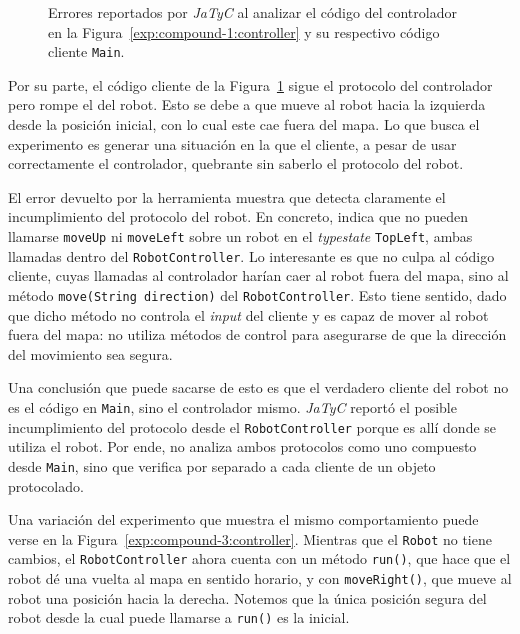 \begin{figure}[htbp]
    \centering
    
    \vspace{0.3cm}
    
    \caption{Errores reportados por \textit{JaTyC} al analizar el código del controlador en la Figura~\ref{exp:compound-1:controller} y su respectivo código cliente \texttt{Main}.}
    \label{exp:compound-1:error}
\end{figure}

Por su parte, el código cliente de la Figura~\ref{exp:compound-1:error} sigue el protocolo del controlador pero rompe el del robot. Esto se debe a que mueve al robot hacia la izquierda desde la posición inicial, con lo cual este cae fuera del mapa. Lo que busca el experimento es generar una situación en la que el cliente, a pesar de usar correctamente el controlador, quebrante sin saberlo el protocolo del robot.

El error devuelto por la herramienta muestra que detecta claramente el incumplimiento del protocolo del robot. En concreto, indica que no pueden llamarse \texttt{moveUp} ni \texttt{moveLeft} sobre un robot en el \textit{typestate} \texttt{TopLeft}, ambas llamadas dentro del \texttt{RobotController}. Lo interesante es que no culpa al código cliente, cuyas llamadas al controlador harían caer al robot fuera del mapa, sino al método \texttt{move(String direction)} del \texttt{RobotController}. Esto tiene sentido, dado que dicho método no controla el \textit{input} del cliente y es capaz de mover al robot fuera del mapa: no utiliza métodos de control para asegurarse de que la dirección del movimiento sea segura.

Una conclusión que puede sacarse de esto es que el verdadero cliente del robot no es el código en \texttt{Main}, sino el controlador mismo. \textit{JaTyC} reportó el posible incumplimiento del protocolo desde el \texttt{RobotController} porque es allí donde se utiliza el robot. Por ende, no analiza ambos protocolos como uno compuesto desde \texttt{Main}, sino que verifica por separado a cada cliente de un objeto protocolado.

Una variación del experimento que muestra el mismo comportamiento puede verse en la Figura~\ref{exp:compound-3:controller}. Mientras que el \texttt{Robot} no tiene cambios, el \texttt{RobotController} ahora cuenta con un método \texttt{run()}, que hace que el robot dé una vuelta al mapa en sentido horario, y con \texttt{moveRight()}, que mueve al robot una posición hacia la derecha. Notemos que la única posición segura del robot desde la cual puede llamarse a \texttt{run()} es la inicial.

